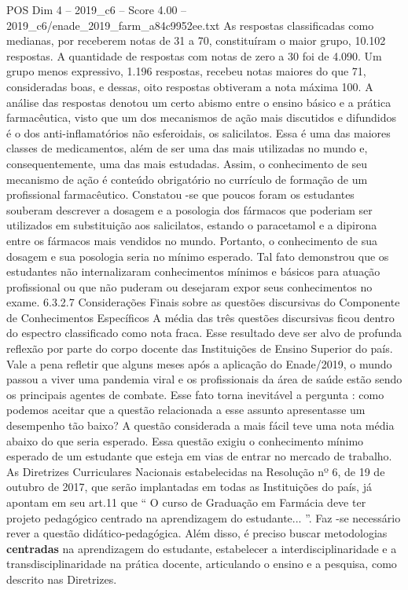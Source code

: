 \begin{textsample}{POS Dim 4 – 2019\_c6 – Score 4.00 – 2019\_c6/enade\_2019\_farm\_a84c9952ee.txt}
As respostas classificadas como medianas, por receberem notas de 31 a 70, constituíram o maior grupo, 10.102 respostas.
A quantidade de respostas com notas de zero a 30 foi de 4.090.
Um grupo menos expressivo, 1.196 respostas, recebeu notas maiores do que 71, consideradas boas, e dessas, oito respostas obtiveram a nota máxima 100.
A análise das respostas denotou um certo abismo entre o ensino básico e a prática farmacêutica, visto que um dos mecanismos de ação mais discutidos e difundidos é o dos anti-inflamatórios não esferoidais, os salicilatos.
Essa é uma das maiores classes de medicamentos, além de ser uma das mais utilizadas no mundo e, consequentemente, uma das mais estudadas.
Assim, o conhecimento de seu mecanismo de ação é conteúdo obrigatório no currículo de formação de um profissional farmacêutico.
Constatou -se que poucos foram os estudantes souberam descrever a dosagem e a posologia dos fármacos que poderiam ser utilizados em substituição aos salicilatos, estando o paracetamol e a dipirona entre os fármacos mais vendidos no mundo.
Portanto, o conhecimento de sua dosagem e sua posologia seria no mínimo esperado.
Tal fato demonstrou que os estudantes não internalizaram conhecimentos mínimos e básicos para atuação profissional ou que não puderam ou desejaram expor seus conhecimentos no exame. 6.3.2.7 Considerações Finais sobre as questões discursivas do Componente de Conhecimentos Específicos A média das três questões discursivas ficou dentro do espectro classificado como nota fraca.
Esse resultado deve ser alvo de profunda reflexão por parte do corpo docente das Instituições de Ensino Superior do país.
Vale a pena refletir que alguns meses após a aplicação do Enade/2019, o mundo passou a viver uma pandemia viral e os profissionais da área de saúde estão sendo os principais agentes de combate.
Esse fato torna inevitável a pergunta : como podemos aceitar que a questão relacionada a esse assunto apresentasse um desempenho tão baixo?
A questão considerada a mais fácil teve uma nota média abaixo do que seria esperado.
Essa questão exigiu o conhecimento mínimo esperado de um estudante que esteja em vias de entrar no mercado de trabalho.
As Diretrizes Curriculares Nacionais estabelecidas na Resolução nº 6, de 19 de outubro de 2017, que serão implantadas em todas as Instituições do país, já apontam em seu art.11 que “ O curso de Graduação em Farmácia deve ter projeto pedagógico centrado na aprendizagem do estudante... ”.
Faz -se necessário rever a questão didático-pedagógica.
Além disso, é preciso buscar metodologias \textbf{centradas} na aprendizagem do estudante, estabelecer a interdisciplinaridade e a transdisciplinaridade na prática docente, articulando o ensino e a pesquisa, como descrito nas Diretrizes.

\end{textsample}
